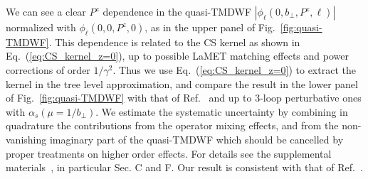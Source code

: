 We can see a clear $P^z$ dependence in the quasi-TMDWF $|\phi_\ell(0,b_{\perp},P^z,\ell)|$ normalized with $\phi_\ell(0,0,P^z,0)$, as in the upper panel of Fig.~\ref{fig:quasi-TMDWF}. This dependence is related to the CS kernel as shown in Eq.~(\ref{eq:CS_kernel_z=0}), up to   possible LaMET matching effects and power corrections of order $1/\gamma^2$. Thus we use Eq.~(\ref{eq:CS_kernel_z=0}) to extract  the kernel in   the tree level approximation, and compare the result in the lower panel of Fig.~\ref{fig:quasi-TMDWF} with that of  Ref.~\cite{Shanahan:2020zxr} and up to 3-loop perturbative ones with $\alpha_s(\mu=1/b_\perp)$. { We estimate the systematic uncertainty by combining in quadrature the  contributions from the operator mixing effects, and   from the non-vanishing  imaginary part of the quasi-TMDWF which should be {cancelled by proper treatments on higher order effects}.} For details see the supplemental materials~\cite{supplemental}, in particular {Sec. C and F}. Our result is consistent with  that of Ref.~\cite{Shanahan:2020zxr}.
